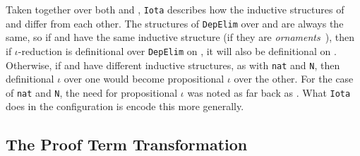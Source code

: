 Taken together over both \A and \B, \lstinline{Iota} describes how the inductive structures of \A and \B differ from each other.
The structures of \lstinline{DepElim} over \A and \B are always the same, so if \A and \B have the same 
inductive structure (if they are \textit{ornaments}~\cite{mcbride}),
then if $\iota$-reduction is definitional over \lstinline{DepElim} on \A, it will also be definitional on \B.
Otherwise, if \A and \B have different inductive structures, as with \lstinline{nat} and \lstinline{N},
then definitional $\iota$ over one would become propositional $\iota$ over the other.
For the case of \lstinline{nat} and \lstinline{N},
the need for propositional $\iota$ was noted as far back as \citet{magaud2000changing}.
What \lstinline{Iota} does in the configuration is encode this more generally.

\subsection{The Proof Term Transformation}
\label{sec:generic}

